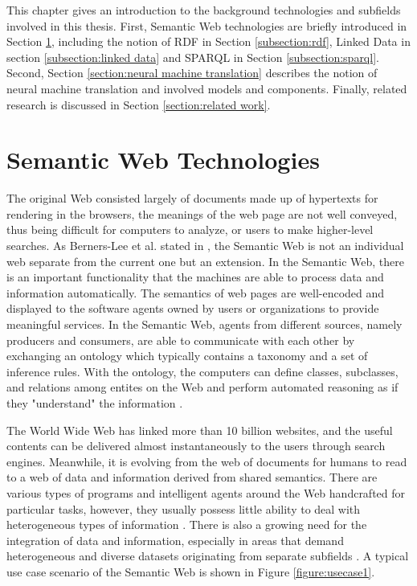 
This chapter gives an introduction to the background technologies and subfields involved in this thesis. First, Semantic Web technologies are briefly introduced in Section \ref{section:semantic web technologies}, including the notion of RDF in Section \ref{subsection:rdf}, Linked Data in section \ref{subsection:linked data} and SPARQL in Section \ref{subsection:sparql}. Second, Section \ref{section:neural machine translation} describes the notion of neural machine translation and involved models and components. Finally, related research is discussed in Section \ref{section:related work}.

\section{Semantic Web Technologies} \label{section:semantic web technologies}

The original Web consisted largely of documents made up of hypertexts for rendering in the browsers, the meanings of the web page are not well conveyed, thus being difficult for computers to analyze, or users to make higher-level searches. As Berners-Lee et al. stated in \cite{Berners-Lee2001}, the Semantic Web is not an individual web separate from the current one but an extension. In the Semantic Web, there is an important functionality that the machines are able to process data and information automatically. The semantics of web pages are well-encoded and displayed to the software agents owned by users or organizations to provide meaningful services. In the Semantic Web, agents from different sources, namely producers and consumers, are able to communicate with each other by exchanging an ontology which typically contains a taxonomy and a set of inference rules. With the ontology, the computers can define classes, subclasses, and relations among entites on the Web and perform automated reasoning as if they "understand" the information \cite{Berners-Lee2001}.

The World Wide Web has linked more than 10 billion websites, and the useful contents can be delivered almost instantaneously to the users through search engines. Meanwhile, it is evolving from the web of documents for humans to read to a web of data and information derived from shared semantics. There are various types of programs and intelligent agents around the Web handcrafted for particular tasks, however, they usually possess little ability to deal with heterogeneous types of information \cite{Shadbolt2006}. There is also a growing need for the integration of data and information, especially in areas that demand heterogeneous and diverse datasets originating from separate subfields \cite{Shadbolt2006}. A typical use case scenario of the Semantic Web is shown in Figure \ref{figure:usecase1}.


